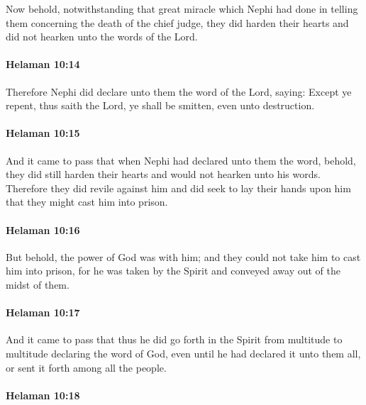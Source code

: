 			Now behold, notwithstanding that great miracle which Nephi had done
			in telling them concerning the death of the chief judge,
			they did harden their hearts
			and did not hearken unto the words of the Lord.

		\paragraph{Helaman 10:14} %
			\label{HELAMAN-10-14}

			Therefore Nephi did declare unto them the word of the Lord, saying:
			Except ye repent, thus saith the Lord, ye shall be smitten, even unto destruction.

		\paragraph{Helaman 10:15} %
			\label{HELAMAN-10-15}

			And it came to pass that when Nephi had declared unto them the word,
			behold, they did still harden their hearts and would not hearken unto his words.
			Therefore they did revile against him
			and did seek to lay their hands upon him
			that they might cast him into prison.

		\paragraph{Helaman 10:16} %
			\label{HELAMAN-10-16}

			But behold, the power of God was with him;
			and they could not take him to cast him into prison,
			for he was taken by the Spirit and conveyed away out of the midst of them.

		\paragraph{Helaman 10:17} %
			\label{HELAMAN-10-17}

			And it came to pass that
			thus he did go forth in the Spirit from multitude to multitude
			declaring the word of God,
			even until he had declared it unto them all,
			or sent it forth among all the people.

		\paragraph{Helaman 10:18} %
			\label{HELAMAN-10-18}

